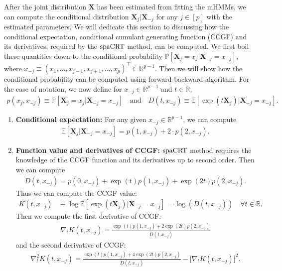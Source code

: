 \documentclass[12pt]{article}
\theoremstyle{definition}
\def\P{\mathbb{P}}
\def\P{\mathbb{P}}
\newcommand{\E}{\mathbb E}								%
\renewcommand{\P}{\mathbb{P}}							%
\newcommand{\prx}{\bm X}								%
\newcommand{\spacrt}{\textnormal{spaCRT}}               %
\begin{document}
After the joint distribution $\prx$ has been estimated from fitting the mHMMs, we can compute the conditional distribution $\prx_j|\prx_{-j}$ for any $j\in[p]$ with the estimated parameters. We will dedicate this section to discussing how the conditional expectation, conditional cumulant generating function (CCGF) and its derivatives, required by the $\spacrt$ method, can be computed. We first boil these quantities down to the conditional probability $\P[\prx_j=x_j|\prx_{-j}=x_{-j}]$, where $x_{-j}\equiv (x_1,\ldots,x_{j-1},x_{j+1},\ldots,x_p)^\top\in\mathbb{R}^{p-1}$. Then we will show how the conditional probability can be computed using forward-backward algorithm. For the ease of notation, we now define for $x_{-j}\in \mathbb{R}^{p-1}$ and $t\in\mathbb{R}$,
\begin{align*}
	p(x_j,x_{-j})\equiv \P[\prx_j=x_j|\prx_{-j}=x_{-j}]\quad\text{and}\quad D(t,x_{-j})\equiv \E[\exp(t\prx_j)|\prx_{-j}=x_{-j}].
\end{align*}
\begin{enumerate}
	\item\textbf{Conditional expectation:} For any given $x_{-j}\in\mathbb{R}^{p-1}$, we can compute
	\begin{align*}
		\E[\prx_j|\prx_{-j}=x_{-j}]=p(1,x_{-j})+2\cdot p(2,x_{-j}).
	\end{align*}
	
	\item\textbf{Function value and derivatives of CCGF:} $\spacrt$ method requires the knowledge of the CCGF function and its derivatives up to second order. Then we can compute
	\begin{align*}
		D(t,x_{-j})=p(0,x_{-j})+\exp(t)p(1,x_{-j})+\exp(2t)p(2,x_{-j}).
	\end{align*}
	Thus we can compute the CCGF value:
	\begin{align*}
		K(t,x_{-j})
		&
		\equiv\log\E[\exp(t\prx_j)|\prx_{-j}=x_{-j}]=\log(D(t,x_{-j}))\quad\forall t\in\mathbb{R}.
	\end{align*}
	Then we compute the first derivative of CCGF:
	\begin{align*}
		\nabla_t K(t,x_{-j})=\frac{\exp(t)p(1,x_{-j})+2\exp(2t)p(2,x_{-j})}{D(t,x_{-j})}
	\end{align*}
	and the second derivative of CCGF:
	\begin{align*}
		\nabla_t^2 K(t,x_{-j})=\frac{\exp(t)p(1,x_{-j})+4\exp(2t)p(2,x_{-j})}{D(t,x_{-j})}-\big[\nabla_t K(t,x_{-j})\big]^2.
	\end{align*}
\end{enumerate}
\end{document}
